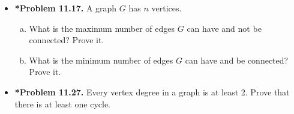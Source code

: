 \documentclass[11pt]{article}
\begin{document}
\begin{itemize}
\vspace{0.1in}

\item \textbf{*Problem 11.17.}
A graph $G$ has $n$ vertices.
\begin{enumerate}[(a)]
\item What is the maximum number of edges $G$ can have and not be connected? Prove it.
\item What is the minimum number of edges $G$ can have and be connected? Prove it.
\end{enumerate}

\vspace{0.1in}

\item \textbf{*Problem 11.27.}
Every vertex degree in a graph is at least 2.
Prove that there is at least one cycle.

\end{itemize}
\end{document}
